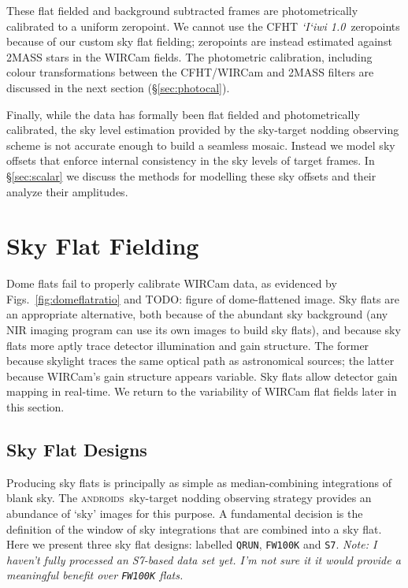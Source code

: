 \documentclass[iop]{emulateapj}
\newcommand{\sw}[1]{\textit{#1}} %
\newcommand{\iiwione}{\sw{`I`iwi 1.0}}
\newcommand{\androids}{\textsc{androids}}
\newcommand{\todo}[1]{\textcolor{BurntOrange}{\textsf{#1}}} %
\newcommand{\comment}[1]{\textcolor{OliveGreen}{\textit{#1}}} %
\newcommand{\Sec}[1]{\S\ref{sec:#1}}  %
\begin{document}
These flat fielded and background subtracted frames are photometrically calibrated to a uniform zeropoint.
We cannot use the CFHT \iiwione\ zeropoints because of our custom sky flat fielding; zeropoints are instead estimated against 2MASS stars in the WIRCam fields.
The photometric calibration, including colour transformations between the CFHT/WIRCam and 2MASS filters are discussed in the next section (\Sec{photocal}).

Finally, while the data has formally been flat fielded and photometrically calibrated, the sky level estimation provided by the sky-target nodding observing scheme is not accurate enough to build a seamless mosaic.
Instead we model sky offsets that enforce internal consistency in the sky levels of target frames.
In \Sec{scalar} we discuss the methods for modelling these sky offsets and their analyze their amplitudes.

\section{Sky Flat Fielding}
\label{sec:flats}

Dome flats fail to properly calibrate WIRCam data, as evidenced by Figs.~\ref{fig:domeflatratio} and \todo{TODO: figure of dome-flattened image}.
Sky flats are an appropriate alternative, both because of the abundant sky background (any NIR imaging program can use its own images to build sky flats), and because sky flats more aptly trace detector illumination and gain structure.
The former because skylight traces the same optical path as astronomical sources; the latter because WIRCam's gain structure appears variable.
Sky flats allow detector gain mapping in real-time.
We return to the variability of WIRCam flat fields later in this section.

\subsection{Sky Flat Designs}
\label{sec:flatdesign}

Producing sky flats is principally as simple as median-combining integrations of blank sky. 
The \androids\ sky-target nodding observing strategy provides an abundance of `sky' images for this purpose.
A fundamental decision is the definition of the window of sky integrations that are combined into a sky flat.
Here we present three sky flat designs: labelled \texttt{QRUN}, \texttt{FW100K} and \texttt{S7}.
\comment{Note: I haven't fully processed an S7-based data set yet. I'm not sure it it would provide a meaningful benefit over \texttt{FW100K} flats.}
\end{document}
